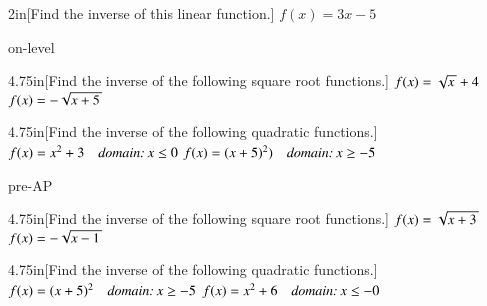 \begin{myWideProblem}[\large]{2in}[Find the inverse of this linear function.]
    {$f(x) = 3x-5$}
\end{myWideProblem}




\begin{taggedblock}{on-level}
    \begin{my2Problems}[\large]{4.75in}[Find the inverse of the following square root functions.]
        {$ f(x) = \myRoot{x} + 4$}
        {$ f(x) = -\myRoot{x+5}$}
    \end{my2Problems}

    \begin{my2Problems}[\large]{4.75in}[Find the inverse of the following quadratic functions.]
        {$ f(x) = x^2 + 3  \quad\text{\itshape domain:\,} x \leq 0$}
        {$ f(x) = (x+5)^2) \quad\text{\itshape domain:\,} x \geq -5$}
    \end{my2Problems}
\end{taggedblock}




\begin{taggedblock}{pre-AP}
    \begin{my2Problems}[\large]{4.75in}[Find the inverse of the following square root functions.]
        {$ f(x) = \myRoot{x+3}$}
        {$ f(x) = -\myRoot{x-1}$}
    \end{my2Problems}

    \begin{my2Problems}[\large]{4.75in}[Find the inverse of the following quadratic functions.]
        {$ f(x) = (x+5)^2 \quad\text{\itshape domain:\,} x \geq -5$}
        {$ f(x) = x^2 + 6 \quad\text{\itshape domain:\,} x \leq -0$}
    \end{my2Problems}
\end{taggedblock}

